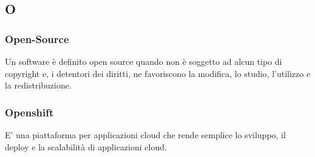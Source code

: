 \subsection*{\textbf{\hfill \Huge{O} \hfill}} 

\subsubsection*{Open-Source}
Un software è definito open source quando non è soggetto ad alcun tipo di copyright e, i detentori dei diritti, ne favoriscono la modifica, lo studio, l'utilizzo e la redistribuzione.

\subsubsection*{Openshift}
E' una piattaforma per applicazioni cloud che rende semplice lo sviluppo, il deploy e la scalabilità di applicazioni cloud.

